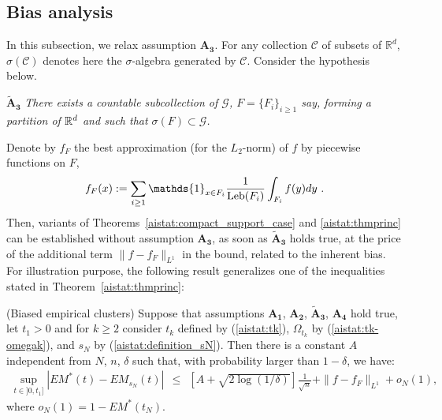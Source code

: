 \subsection{Bias analysis}
\label{aistat:biais}
In this subsection, we relax assumption $\mathbf{A_3}$. For any collection $\mathcal{C}$ of subsets of $\mathbb{R}^d$, $\sigma(\mathcal{C})$ denotes here the $\sigma$-algebra generated by $\mathcal{C}$.
Consider the hypothesis below.

\noindent
$\mathbf{\tilde A_3}$  {\it There exists a countable subcollection of $\mathcal{G}$, $F=\{F_i\}_{i \ge 1}$ say, forming a partition of $\mathbb{R}^d$ and such that $\sigma (F) \subset \mathcal{G}$.} 

 Denote by $f_{F}$ the best approximation (for the $L_2$-norm) of $f$ by piecewise functions on $F$, $$f_{F}(x) := \sum_{i \ge 1} \mathds{1}_{x \in F_i} \frac{1}{\leb(F_i)} \int_{F_i}f(y)dy~.$$
Then, variants of Theorems~\ref{aistat:compact_support_case} and \ref{aistat:thmprinc} can be established without assumption $\mathbf{A_3}$, as soon as $\mathbf{\tilde A_3}$ holds true, at the price of the additional term $\|f-f_{F}\|_{L^1}$ in the bound, related to the inherent bias. For illustration purpose, the following result generalizes one of the inequalities stated in Theorem~\ref{aistat:thmprinc}:

\begin{theorem}({\sc Biased empirical clusters})
\label{aistat:thmprincbiais}
Suppose that assumptions $\mathbf{A_1}$, $\mathbf{A_2}$,
$\mathbf{\tilde A_3}$, $\mathbf{A_4}$ hold true, let $t_1>0$ and for $k \ge 2$ consider $t_k$ defined by (\ref{aistat:tk}), $\Omega_{t_k}$ by (\ref{aistat:tk-omegak}), and $s_N$ by (\ref{aistat:definition_sN}). Then there is a constant $A$ independent from $N$, $n$, $\delta$ such that, with probability larger than $1-\delta$, we have: 
\begin{align*}
\sup_{t \in ]0,t_1]}|EM^*(t)-EM_{s_N}(t)| ~~\le~~ \left[A+\sqrt{2\log(1/\delta)}\right]\frac{1}{\sqrt n} + \|f-f_{F}\|_{L^1}  + o_N(1), 
\end{align*}
where $o_N(1)=1-EM^*(t_N)$. 
\end{theorem}

